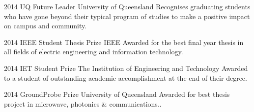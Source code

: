 \documentclass[]{friggeri-cv} %
\begin{document}
\begin{entrylist}
\entry
{2014}
{UQ Future Leader}
{University of Queensland}
{Recognises graduating students who have gone beyond their typical program of studies to make a positive impact on campus and community.}
\end{entrylist}
\begin{entrylist}
\entry
{2014}
{IEEE Student Thesis Prize}
{IEEE}
{Awarded for the best final year thesis in all fields of electric engineering and information technology.}
\end{entrylist}
\begin{entrylist}
\entry
{2014}
{IET Student Prize}
{The Institution of Engineering and Technology}
{Awarded to a student of outstanding academic accomplishment at the end of their degree.}
\end{entrylist}
\begin{entrylist}
\entry
{2014}
{GroundProbe Prize}
{University of Queensland}
{Awarded for best thesis project in microwave, photonics \& communications..}
\end{entrylist}
\end{document}

